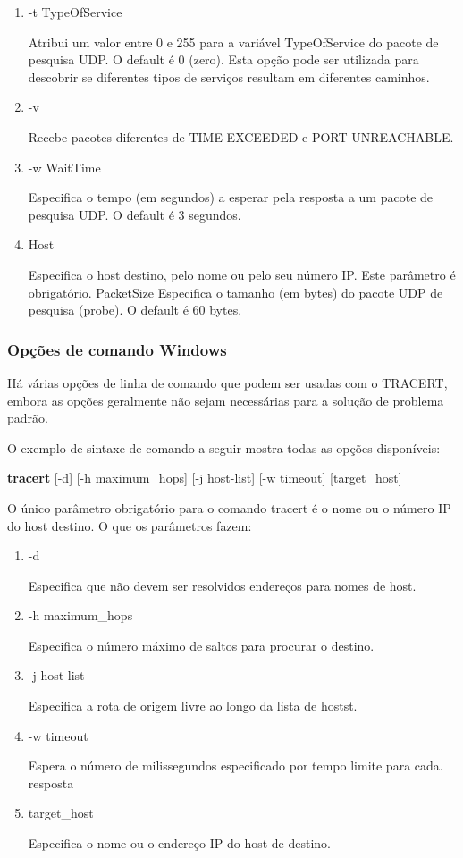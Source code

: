 \documentclass[
	article,			%
	11pt,				%
	oneside,			%
	a4paper,			%
	english,			%
	brazil,				%
	sumario=tradicional
	]{abntex2}
\begin{document}
\begin{enumerate}
	\item -t TypeOfService
	
	Atribui um valor entre 0 e 255 para a variável TypeOfService do pacote de pesquisa UDP. O default é 0 (zero). Esta opção pode ser utilizada para descobrir se diferentes tipos de serviços resultam em diferentes caminhos.
	
	\item -v
	
	Recebe pacotes diferentes de TIME-EXCEEDED e PORT-UNREACHABLE.
	
	\item -w WaitTime 
	
	Especifica o tempo (em segundos) a esperar pela resposta a um pacote de pesquisa UDP. O default é 3 segundos.
	
	
	\item Host      
	
	Especifica o host destino, pelo nome ou pelo seu número IP. Este parâmetro é obrigatório. PacketSize Especifica o tamanho (em bytes)  do pacote UDP de pesquisa (probe). O default é 60 bytes.     
\end{enumerate}                    


\subsubsection{Opções de comando Windows}
Há várias opções de linha de comando que podem ser usadas com o TRACERT, embora as opções geralmente não sejam necessárias para a solução de problema padrão.

O exemplo de sintaxe de comando a seguir mostra todas as opções disponíveis:

\textbf{tracert} [-d] [-h maximum\_hops] [-j host-list] [-w timeout] [target\_host]

O único parâmetro obrigatório para o comando tracert é o nome ou o número IP do host destino. O que os parâmetros fazem:

\begin{enumerate}
	\item -d
	
	Especifica que não devem ser resolvidos endereços para nomes de host.
	
	\item -h maximum\_hops
	
	 Especifica o número máximo de saltos para procurar o destino.
	 
	\item -j host-list
	
      Especifica a rota de origem livre ao longo da lista de hostst.
	
	\item -w timeout 
	
	Espera o número de milissegundos especificado por tempo limite para cada.
	resposta

	\item target\_host
	      
	 Especifica o nome ou o endereço IP do host de destino.   
\end{enumerate}                    
\end{document}

